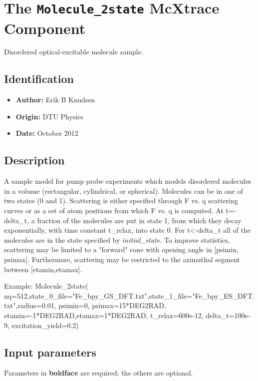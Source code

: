 \section{The \texttt{Molecule\_2state} McXtrace Component}
Disordered optical-excitable molecule sample.

\subsection*{Identification}
\begin{itemize}
  \item \textbf{Author:} Erik B Knudsen
  \item \textbf{Origin:} DTU Physics
  \item \textbf{Date:} October 2012
\end{itemize}

\subsection*{Description}
A sample model for pump probe experiments which models disordered molecules in a volume (rectangular, cylindrical, or spherical). Molecules can be in one of two states (0 and 1). Scattering is either specified through F vs. q scattering curves or as a set of atom positions from which F vs. q is computed. At t=-delta\_t, a fraction of the molecules are put in state 1, from which they decay exponentially, with time constant t\_relax, into state 0. For t\textless{}-delta\_t all of the molecules are in the state specified by \textit{initial\_state}. To improve statistics, scattering may be limited to a "forward" cone with opening angle in [psimin, psimax]. Furthermore, scattering may be restricted to the azimuthal segment between [etamin,etamax].

Example: Molecule\_2state( nq=512,state\_0\_file="Fe\_bpy\_GS\_DFT.txt",state\_1\_file="Fe\_bpy\_ES\_DFT.txt",radius=0.01, psimin=0, psimax=15*DEG2RAD, etamin=-1*DEG2RAD,etamax=1*DEG2RAD, t\_relax=600e-12, delta\_t=100e-9, excitation\_yield=0.2)

\subsection*{Input parameters}
Parameters in \textbf{boldface} are required; the others are optional.

